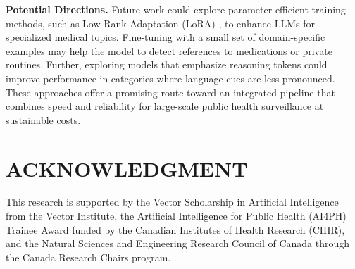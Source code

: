 \documentclass[letterpaper, 10 pt, conference]{ieeeconf} %
\begin{document}
{\bf Potential Directions.} Future work could explore parameter-efficient training methods, such as Low-Rank Adaptation (LoRA) \cite{hu2021loralowrankadaptationlarge}, to enhance LLMs for specialized medical topics. Fine-tuning with a small set of domain-specific examples may help the model to detect references to medications or private routines. Further, exploring models that emphasize reasoning tokens \cite{zhong2024evaluation} could improve performance in categories where language cues are less pronounced. These approaches offer a promising route toward an integrated pipeline that combines speed and reliability for large-scale public health surveillance at sustainable costs.

\vspace{-3mm}
\section*{ACKNOWLEDGMENT}
This research is supported by the Vector Scholarship in Artificial Intelligence from the Vector Institute, the Artificial Intelligence for Public Health (AI4PH) Trainee Award funded by the Canadian Institutes of Health Research (CIHR), and the Natural Sciences and Engineering Research Council of Canada through the Canada Research Chairs  program.



\vspace{-1mm}

\printbibliography
\end{document}
